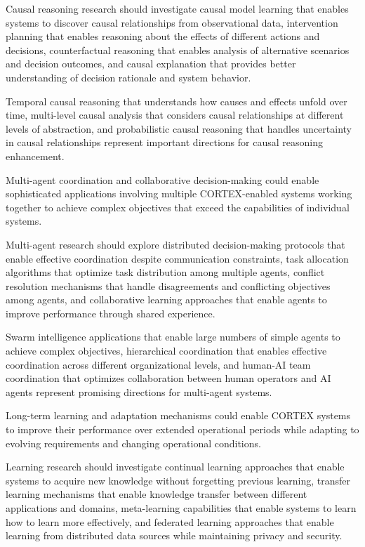 Causal reasoning research should investigate causal model learning that enables systems to discover causal relationships from observational data, intervention planning that enables reasoning about the effects of different actions and decisions, counterfactual reasoning that enables analysis of alternative scenarios and decision outcomes, and causal explanation that provides better understanding of decision rationale and system behavior.

Temporal causal reasoning that understands how causes and effects unfold over time, multi-level causal analysis that considers causal relationships at different levels of abstraction, and probabilistic causal reasoning that handles uncertainty in causal relationships represent important directions for causal reasoning enhancement.

Multi-agent coordination and collaborative decision-making could enable sophisticated applications involving multiple CORTEX-enabled systems working together to achieve complex objectives that exceed the capabilities of individual systems.

Multi-agent research should explore distributed decision-making protocols that enable effective coordination despite communication constraints, task allocation algorithms that optimize task distribution among multiple agents, conflict resolution mechanisms that handle disagreements and conflicting objectives among agents, and collaborative learning approaches that enable agents to improve performance through shared experience.

Swarm intelligence applications that enable large numbers of simple agents to achieve complex objectives, hierarchical coordination that enables effective coordination across different organizational levels, and human-AI team coordination that optimizes collaboration between human operators and AI agents represent promising directions for multi-agent systems.

Long-term learning and adaptation mechanisms could enable CORTEX systems to improve their performance over extended operational periods while adapting to evolving requirements and changing operational conditions.

Learning research should investigate continual learning approaches that enable systems to acquire new knowledge without forgetting previous learning, transfer learning mechanisms that enable knowledge transfer between different applications and domains, meta-learning capabilities that enable systems to learn how to learn more effectively, and federated learning approaches that enable learning from distributed data sources while maintaining privacy and security.

